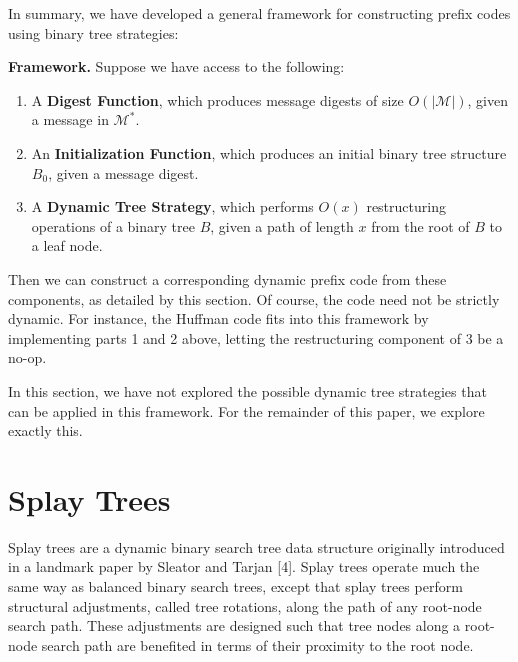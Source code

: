 \documentclass[twoside]{article}
\begin{document}
\begin{multicols}{2}
In summary, we have developed a general framework for constructing prefix codes using binary tree strategies:

\vspace{0.5em}
\noindent \textbf{Framework. } Suppose we have access to the following:

\begin{enumerate}
\item A \textbf{Digest Function}, which produces message digests of size $O(|\mathcal{M}|)$, given a message in $\mathcal{M}^*$.
\item An \textbf{Initialization Function}, which produces an initial binary tree structure $B_0$, given a message digest.
\item A \textbf{Dynamic Tree Strategy}, which performs $O(x)$ restructuring operations of a binary tree $B$, given a path of length $x$ from the root of $B$ to a leaf node.
\end{enumerate}

Then we can construct a corresponding dynamic prefix code from these components, as detailed by this section. Of course, the code need not be strictly dynamic. For instance, the Huffman code fits into this framework by implementing parts 1 and 2 above, letting the restructuring component of 3 be a no-op.

In this section, we have not explored the possible dynamic tree strategies that can be applied in this framework. For the remainder of this paper, we explore exactly this.

\section{Splay Trees}


Splay trees are a dynamic binary search tree data structure originally introduced in a landmark paper by Sleator and Tarjan [4]. Splay trees operate much the same way as balanced binary search trees, except that splay trees perform structural adjustments, called tree rotations, along the path of any root-node search path. These adjustments are designed such that tree nodes along a root-node search path are benefited in terms of their proximity to the root node.


\end{multicols}
\end{document}
